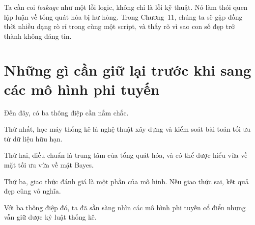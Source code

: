 Ta cần coi \emph{leakage} như một lỗi logic, không chỉ là lỗi kỹ thuật. Nó làm thói quen lập luận về tổng quát hóa bị hư hỏng. Trong Chương~11, chúng ta sẽ gặp đồng thời nhiều dạng rò rỉ trong cùng một script, và thấy rõ vì sao con số đẹp trở thành không đáng tin.

\section{Những gì cần giữ lại trước khi sang các mô hình phi tuyến}

Đến đây, có ba thông điệp cần nắm chắc.

Thứ nhất, học máy thống kê là nghệ thuật xây dựng và kiểm soát bài toán tối ưu từ dữ liệu hữu hạn.

Thứ hai, điều chuẩn là trung tâm của tổng quát hóa, và có thể được hiểu vừa về mặt tối ưu vừa về mặt Bayes.

Thứ ba, giao thức đánh giá là một phần của mô hình. Nếu giao thức sai, kết quả đẹp cũng vô nghĩa.

Với ba thông điệp đó, ta đã sẵn sàng nhìn các mô hình phi tuyến cổ điển nhưng vẫn giữ được kỷ luật thống kê.
